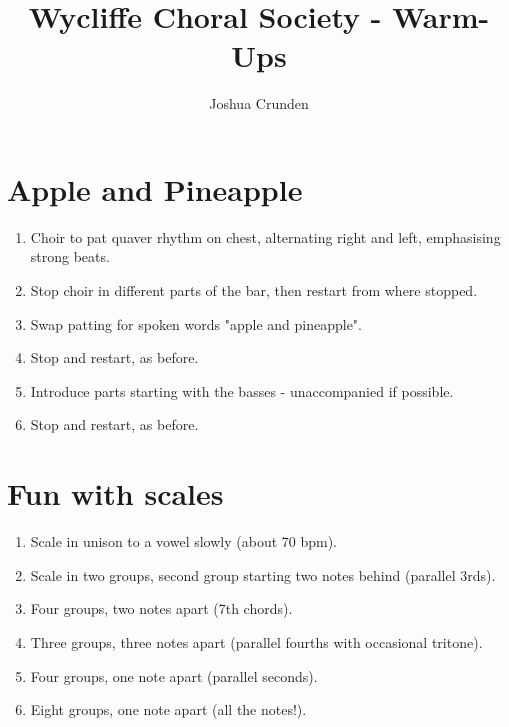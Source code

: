 \documentclass{article}
\title{Wycliffe Choral Society - Warm-Ups}
\author{Joshua Crunden}
\date{}
\begin{document}
\maketitle
\section{Apple and Pineapple}
\begin{enumerate}
	\item Choir to pat quaver rhythm on chest, alternating right and left, emphasising strong beats.
	\item Stop choir in different parts of the bar, then restart from where stopped.
	\item Swap patting for spoken words "apple and pineapple".
	\item Stop and restart, as before.
	\item Introduce parts starting with the basses - unaccompanied if possible.
	\item Stop and restart, as before.
\end{enumerate}

\section{Fun with scales}
\begin{enumerate}
	\item Scale in unison to a vowel slowly (about 70 bpm).
	\item Scale in two groups, second group starting two notes behind (parallel 3rds).
	\item Four groups, two notes apart (7th chords).
	\item Three groups, three notes apart (parallel fourths with occasional tritone).
	\item Four groups, one note apart (parallel seconds).
	\item Eight groups, one note apart (all the notes!).
\end{enumerate}
\end{document}
